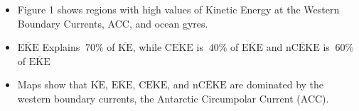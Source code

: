 \documentclass[draft,linenumbers]{agujournal2019}
\newcommand{\MKE}{\overline{\textrm{KE}}}
\newcommand{\MEKE}{\overline{\textrm{EKE}}}
\newcommand{\MCEKE}{\overline{\textrm{CEKE}}}
\newcommand{\MnCEKE}{\overline{\textrm{nCEKE}}}
\begin{document}

	\begin{itemize}
		\item Figure 1 shows regions with high values of Kinetic Energy at the Western Boundary Currents, ACC, and ocean gyres. 
		\item $\MEKE$ Explains $~70\%$ of $\MKE$, while $\MCEKE$ is $~40\%$ of $\MEKE$ and $\MnCEKE$  is $~60\%$ of $\MEKE$ 
		\item Maps show that $\MKE$, $\MEKE$, $\MCEKE$, and $\MnCEKE$ are dominated by the western boundary currents, the Antarctic Circumpolar Current (ACC).
	\end{itemize}
	
\end{document}
